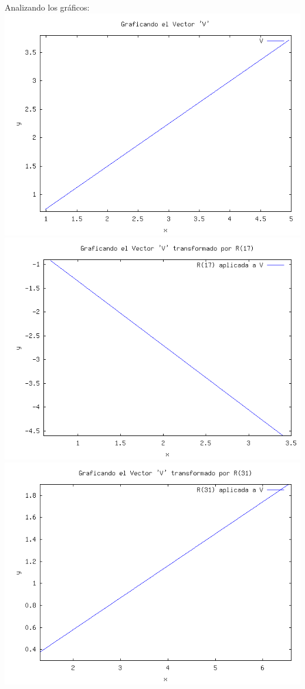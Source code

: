 \begin{enumerate}
		Analizando los gráficos:\\
		\includegraphics[scale=0.3]{imagenes/3_v.png}
		\includegraphics[scale=0.3]{imagenes/3_va.png}\\
		\includegraphics[scale=0.3]{imagenes/3_vb.png}

\end{enumerate}

